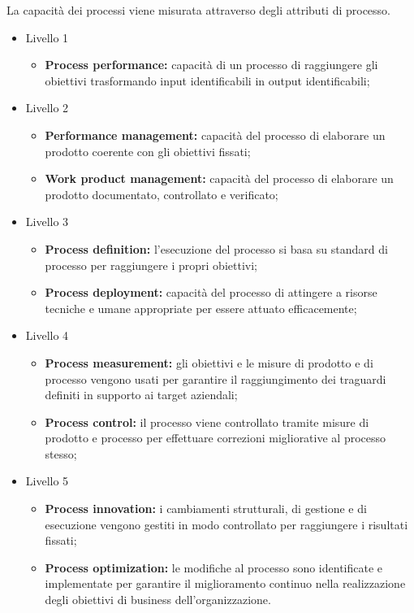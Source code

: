 \documentclass[PianoDiQualifica.tex]{subfiles}
\begin{document}
\begin{appendices}
		La capacità dei processi viene misurata attraverso degli attributi di processo.
		\begin{itemize}
			\item Livello 1
			\begin{itemize}
				\item \textbf{Process performance:} capacità di un processo di raggiungere gli obiettivi trasformando input identificabili in output identificabili;
			\end{itemize}
			\item Livello 2
			\begin{itemize}
				\item \textbf{Performance management:} capacità del processo di elaborare un prodotto coerente con gli obiettivi fissati;
				\item \textbf{Work product management:} capacità del processo di elaborare un prodotto documentato, controllato e verificato;
			\end{itemize}
			\item Livello 3
			\begin{itemize}
				\item \textbf{Process definition:} l'esecuzione del processo si basa su standard di processo per raggiungere i propri obiettivi;
				\item \textbf{Process deployment:} capacità del processo di attingere a risorse tecniche e umane appropriate per essere attuato efficacemente;
			\end{itemize}
			\item Livello 4
			\begin{itemize}
				\item \textbf{Process measurement:} gli obiettivi e le misure di prodotto e di processo vengono usati per garantire il raggiungimento dei traguardi definiti in supporto ai target aziendali;
				\item \textbf{Process control:} il processo viene controllato tramite misure di prodotto e processo per effettuare correzioni migliorative al processo stesso;
			\end{itemize}
			\item Livello 5
			\begin{itemize}
				\item \textbf{Process innovation:} i cambiamenti strutturali, di gestione e di esecuzione vengono gestiti in modo controllato per raggiungere i risultati fissati;
				\item \textbf{Process optimization:} le modifiche al processo sono identificate e implementate per garantire il miglioramento continuo nella realizzazione degli obiettivi di business dell'organizzazione. 
			\end{itemize}
		\end{itemize}
		

\end{appendices}
\end{document}
